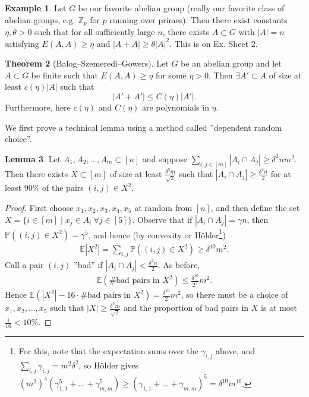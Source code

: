 \documentclass{article}
\theoremstyle{definition}
\newtheorem{theorem}{Theorem}[section]
\newtheorem{lemma}[theorem]{Lemma}
\newtheorem{example}[theorem]{Example}
\begin{document}
\begin{example}
    Let $G$ be our favorite abelian group (really our favorite class of abelian groups, e.g. $\mathbb{Z}_p$ for $p$ running over primes). Then there exist constants $\eta,\theta>0$ such that for all sufficiently large $n$, there exists $A \subset G$ with $\left|A\right| = n$ satisfying $E(A,A) \ge \eta$ and $\left|A+A\right|\ge \theta \left|A\right|^2$. This is on Ex. Sheet 2.
\end{example}
\begin{theorem}[Balog--Szemeredi--Gowers]\label{theorem2.15}
    Let $G$ be an abelian group and let $A \subset G$ be finite such that $E(A,A) \ge \eta$ for some $\eta >0$. Then $\exists A' \subset A$ of size at least $c(\eta)\left|A\right|$ such that $$\left|A'+A'\right| \le C(\eta)\left|A'\right|.$$
    Furthermore, here $c(\eta)$ and $C(\eta)$ are polynomials in $\eta$.
\end{theorem}
We first prove a technical lemma using a method called ''dependent random choice''. 
\begin{lemma}\label{lemma2.16}
    Let $A_1,A_2,\ldots,A_m \subset [n]$ and suppose $\sum_{i,j \in [m]}^{} \left|A_i \cap A_j\right|\ge \delta^2 nm^2$. Then there exists $X \subset [m]$ of size at least $\frac{\delta^5 m}{\sqrt{2}}$ such that $\left|A_i \cap A_j\right|\ge \frac{\delta^2n}{2}$ for at least $90\%$ of the pairs $(i,j) \in X^2$.
\end{lemma}
\begin{proof}
    First choose $x_1,x_2,x_3,x_4,x_5$ at random from $[n]$, and then define the set $X = \{i \in [m] \mid x_j \in A_i ~\forall j \in [5]\}$. Observe that if $\left|A_i \cap A_j\right| = \gamma n$, then $\mathbb{P}\left((i,j) \in X^2\right) = \gamma^5$, and hence (by convexity or Hölder\footnote{For this, note that the expectation sums over the $\gamma_{i,j}$ above, and $\sum_{i,j}^{} \gamma_{i,j}=m^2\delta^2$, so Hölder gives $(m^2)^4(\gamma_{1,1}^5 + \ldots + \gamma_{m,m}^5)\ge (\gamma_{1,1}+\ldots+\gamma_{m,m})^5 = \delta^{10}m^{10}$.})
    \begin{align*}
        \mathbb{E}\left|X^2\right| = \sum_{i,j}^{} \mathbb{P}\left((i,j)\in X^2\right) \ge \delta^{10}m^2.
    \end{align*}
    Call a pair $(i,j)$ ''bad'' if $\left|A_i \cap A_j\right| < \frac{\delta^2 n}{2}$. As before,
    \begin{align*}
        \mathbb{E}(\# \text{bad pairs in }X^2) \le \frac{\delta^{10}}{2^5}m^2.
    \end{align*}
    Hence $\mathbb{E}\left(\left|X^2\right| - 16 \cdot \# \text{bad pairs in }X^2\right)=\frac{\delta^{10}}{2}m^2$, so there must be a choice of $x_1,x_2,\ldots,x_5$ such that $\left|X\right| \ge  \frac{\delta^5 m}{\sqrt{2}}$ and the proportion of bad pairs in $X$ is at most $\frac{1}{16}< 10\%$.
\end{proof}
\end{document}
